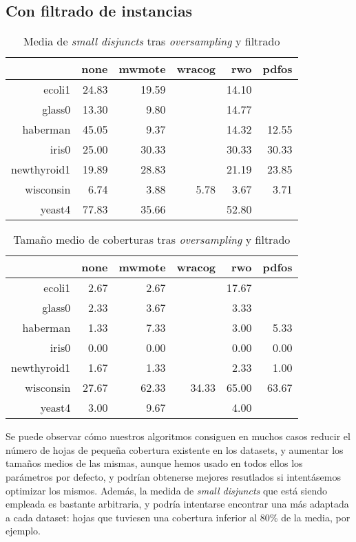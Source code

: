 \subsection{Con filtrado de instancias}
  \begin{table}[H]
  \centering
  \begin{tabular}{rrrrrr}
   \hline
   & none & mwmote & wracog & rwo & pdfos \\ 
   \hline
   ecoli1 & 24.83 & 19.59 &  & 14.10 &  \\ 
   glass0 & 13.30 & 9.80 &  & 14.77 &  \\ 
   haberman & 45.05 & 9.37 &  & 14.32 & 12.55 \\ 
   iris0 & 25.00 & 30.33 &  & 30.33 & 30.33 \\ 
   newthyroid1 & 19.89 & 28.83 &  & 21.19 & 23.85 \\ 
   wisconsin & 6.74 & 3.88 & 5.78 & 3.67 & 3.71 \\ 
   yeast4 & 77.83 & 35.66 &  & 52.80 &  \\ 
   \hline
  \end{tabular}
  \caption{Media de \textit{small disjuncts} tras \textit{oversampling} y filtrado}
  \end{table}

  \begin{table}[H]
  \centering
  \begin{tabular}{rrrrrr}
   \hline
   & none & mwmote & wracog & rwo & pdfos \\ 
   \hline
   ecoli1 & 2.67 & 2.67 &  & 17.67 &  \\ 
   glass0 & 2.33 & 3.67 &  & 3.33 &  \\ 
   haberman & 1.33 & 7.33 &  & 3.00 & 5.33 \\ 
   iris0 & 0.00 & 0.00 &  & 0.00 & 0.00 \\ 
   newthyroid1 & 1.67 & 1.33 &  & 2.33 & 1.00 \\ 
   wisconsin & 27.67 & 62.33 & 34.33 & 65.00 & 63.67 \\ 
   yeast4 & 3.00 & 9.67 &  & 4.00 &  \\ 
   \hline
  \end{tabular}
  \caption{Tamaño medio de coberturas tras \textit{oversampling} y filtrado}
  \end{table}
  
  Se puede observar cómo nuestros algoritmos consiguen en muchos casos reducir el número de hojas de pequeña 
  cobertura existente en los datasets, y aumentar los tamaños medios de las mismas, aunque hemos usado en todos ellos
  los parámetros por defecto, y podrían obtenerse mejores resutlados si intentásemos optimizar los mismos. Además, la medida
  de \textit{small disjuncts} que está siendo empleada es bastante arbitraria, y podría intentarse encontrar una más
  adaptada a cada dataset: hojas que tuviesen una cobertura inferior al 80\% de la media, por ejemplo.
 